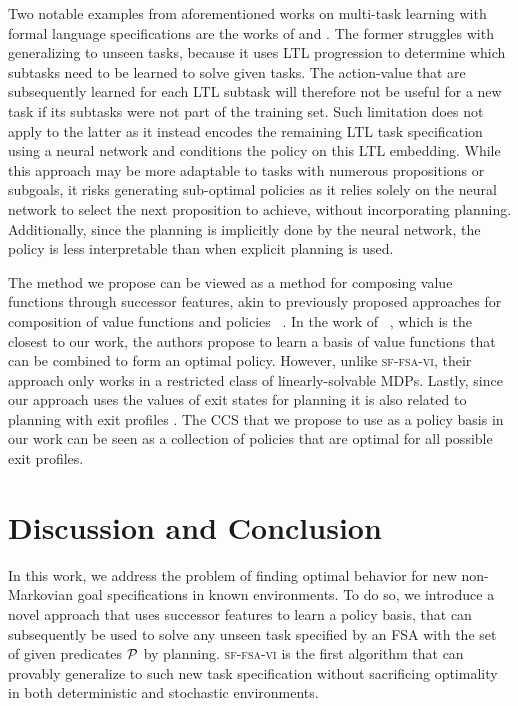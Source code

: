 Two notable examples from aforementioned works on multi-task learning with formal language specifications are the works of \citep{Icarte2018b} and \citep{Vaezipoor2021}. The former struggles with generalizing to unseen tasks, because it uses LTL progression to determine which subtasks need to be learned to solve given tasks. The action-value that are subsequently learned for each LTL subtask will therefore not be useful for a new task if its subtasks were not part of the training set. Such limitation does not apply to the latter as it instead encodes the remaining LTL task specification using a neural network and conditions the policy on this LTL embedding. While this approach may be more adaptable to tasks with numerous propositions or subgoals, it risks generating sub-optimal policies as it relies solely on the neural network to select the next proposition to achieve, without incorporating planning. Additionally, since the planning is implicitly done by the neural network, the policy is less interpretable than when explicit planning is used.

The method we propose can be viewed as a method for composing value functions through successor features, akin to previously proposed approaches for composition of value functions and policies ~\citep{Niekerk2019, Barreto2019, NangueTasse2020, Infante2022}. In the work of ~\citep{Infante2022}, which is the closest to our work, the authors propose to learn a basis of value functions that can be combined to form an optimal policy. However, unlike \textsc{sf-fsa-vi}, their approach only works in a restricted class of linearly-solvable MDPs. Lastly, since our approach uses the values of exit states for planning it is also related to planning with exit profiles \citep{Wen2020}. The CCS that we propose to use as a policy basis in our work can be seen as a collection of policies that are optimal for all possible exit profiles.

\section{Discussion and Conclusion}

In this work, we address the problem of finding optimal behavior for new non-Markovian goal specifications in known environments. To do so, we introduce a novel approach that uses successor features to learn a policy basis, that can subsequently be used to solve any unseen task specified by an FSA with the set of given predicates $\mathcal{P}$ by planning. \textsc{sf-fsa-vi} is the first algorithm that can provably generalize to such new task specification without sacrificing optimality in both deterministic and stochastic environments.

